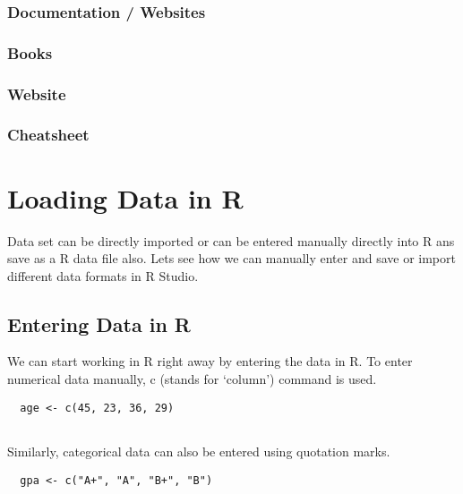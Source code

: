 \documentclass[
]{book}
\begin{document}
\hypertarget{documentation-websites}{%
\subsection{Documentation / Websites}\label{documentation-websites}}

\hypertarget{books}{%
\subsection{Books}\label{books}}

\hypertarget{website}{%
\subsection{Website}\label{website}}

\hypertarget{cheatsheet}{%
\subsection{Cheatsheet}\label{cheatsheet}}

\hypertarget{loading-data-in-r}{%
\chapter{Loading Data in R}\label{loading-data-in-r}}

Data set can be directly imported or can be entered manually directly into R ans save as a R data file also. Lets see how we can manually enter and save or import different data formats in R Studio.

\hypertarget{entering-data-in-r}{%
\section{Entering Data in R}\label{entering-data-in-r}}

We can start working in R right away by entering the data in R. To enter numerical data manually, c (stands for `column') command is used.

\begin{verbatim}
  age <- c(45, 23, 36, 29)
  
\end{verbatim}

Similarly, categorical data can also be entered using quotation marks.

\begin{verbatim}
  gpa <- c("A+", "A", "B+", "B")
  
\end{verbatim}
\end{document}
